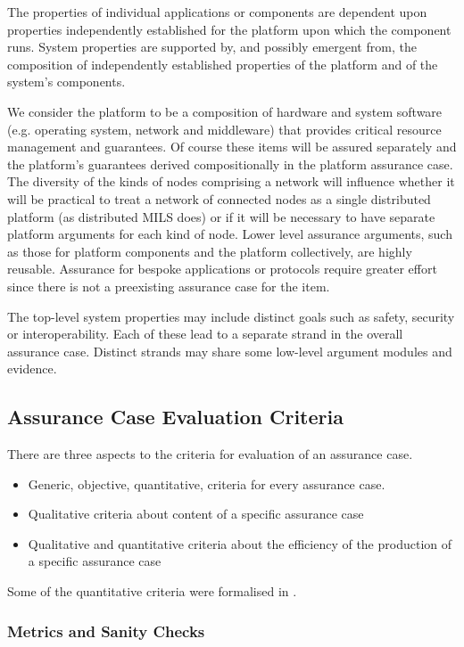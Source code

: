\documentclass[12pt,twoside,a4paper]{article}
\begin{document}
The properties of individual applications or components are dependent upon properties independently established for the platform upon which the component runs.
System properties are supported by, and possibly emergent from, the composition of independently established properties of the platform and of the system's components.

We consider the platform to be a composition of hardware and system software (e.g. operating system, network and middleware) that provides critical resource management and guarantees.
Of course these items will be assured separately and the platform's guarantees derived compositionally in the platform assurance case.
The diversity of the kinds of nodes comprising a network will influence whether it will be practical to treat a network of connected nodes as a single distributed platform (as distributed MILS does) or if it will be necessary to have separate platform arguments for each kind of node.
Lower level assurance arguments, such as those for platform components and the platform collectively, are highly reusable.
Assurance for bespoke applications or protocols require greater effort since there is not a preexisting assurance case for the item.

The top-level system properties may include distinct goals such as safety, security or interoperability.
Each of these lead to a separate strand in the overall assurance case.
Distinct strands may share some low-level argument modules and evidence.

\subsection{Assurance Case Evaluation Criteria}
\label{sec:eval}

There are three aspects to the criteria for evaluation of an assurance case.

\begin{itemize}
\item Generic, objective, quantitative, criteria for every assurance case.
\item Qualitative criteria about content of a specific assurance case
\item Qualitative and quantitative criteria about the efficiency of the production of a specific assurance case
\end{itemize}
Some of the quantitative criteria were formalised in \cite{D-MILS-D2.4}.

\subsubsection{Metrics and Sanity Checks}
\end{document}
